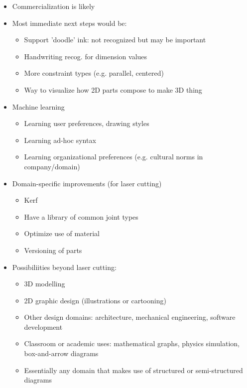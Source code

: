\begin{itemize}
\item Commercialization is likely
\item Most immediate next steps would be:
  \begin{itemize}
  \item Support 'doodle' ink: not recognized but may be important
  \item Handwriting recog. for dimension values
  \item More constraint types (e.g. parallel, centered)
  \item Way to visualize how 2D parts compose to make 3D thing
  \end{itemize}
\item Machine learning
  \begin{itemize}
    \item Learning user preferences, drawing styles
    \item Learning ad-hoc syntax
    \item Learning organizational preferences (e.g. cultural norms in
      company/domain)
  \end{itemize}
\item Domain-specific improvements (for laser cutting)
  \begin{itemize}
  \item Kerf
  \item Have a library of common joint types
  \item Optimize use of material
  \item Versioning of parts
  \end{itemize}
\item Possibiliities beyond laser cutting:
  \begin{itemize}
  \item 3D modelling
  \item 2D graphic design (illustrations or cartooning)
  \item Other design domains: architecture, mechanical engineering,
    software development
  \item Classroom or academic uses: mathematical graphs, physics
    simulation, box-and-arrow diagrams
  \item Essentially any domain that makes use of structured or
    semi-structured diagrams
  \end{itemize}
\end{itemize}
